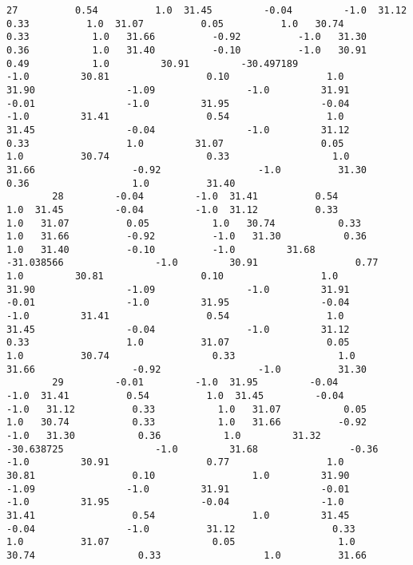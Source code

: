 \documentclass[11pt]{article}
\begin{document}
\begin{Verbatim}[commandchars=\\\{\}]
        27          0.54          1.0  31.45         -0.04         -1.0  31.12          0.33          1.0  31.07          0.05          1.0   30.74          0.33           1.0   31.66          -0.92          -1.0   31.30           0.36           1.0   31.40          -0.10          -1.0   30.91           0.49           1.0         30.91         -30.497189                -1.0         30.81                 0.10                 1.0         31.90                -1.09                -1.0         31.91                -0.01                -1.0         31.95                -0.04                -1.0         31.41                 0.54                 1.0         31.45                -0.04                -1.0         31.12                 0.33                 1.0         31.07                 0.05                 1.0          30.74                 0.33                  1.0          31.66                 -0.92                 -1.0          31.30                  0.36                  1.0          31.40   
        28         -0.04         -1.0  31.41          0.54          1.0  31.45         -0.04         -1.0  31.12          0.33          1.0   31.07          0.05           1.0   30.74           0.33           1.0   31.66          -0.92          -1.0   31.30           0.36           1.0   31.40          -0.10          -1.0         31.68         -31.038566                -1.0         30.91                 0.77                 1.0         30.81                 0.10                 1.0         31.90                -1.09                -1.0         31.91                -0.01                -1.0         31.95                -0.04                -1.0         31.41                 0.54                 1.0         31.45                -0.04                -1.0         31.12                 0.33                 1.0          31.07                 0.05                  1.0          30.74                  0.33                  1.0          31.66                 -0.92                 -1.0          31.30   
        29         -0.01         -1.0  31.95         -0.04         -1.0  31.41          0.54          1.0  31.45         -0.04         -1.0   31.12          0.33           1.0   31.07           0.05           1.0   30.74           0.33           1.0   31.66          -0.92          -1.0   31.30           0.36           1.0         31.32         -30.638725                -1.0         31.68                -0.36                -1.0         30.91                 0.77                 1.0         30.81                 0.10                 1.0         31.90                -1.09                -1.0         31.91                -0.01                -1.0         31.95                -0.04                -1.0         31.41                 0.54                 1.0         31.45                -0.04                -1.0          31.12                 0.33                  1.0          31.07                  0.05                  1.0          30.74                  0.33                  1.0          31.66   

\end{Verbatim}
\end{document}
